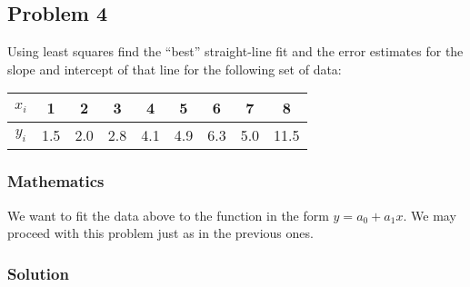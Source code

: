\subsection{Problem 4}%
\label{sec:problem_4}
Using least squares find the ``best'' straight-line fit and the error estimates for the
slope and intercept of that line for the following set of data:
\begin{center}
  \begin{tabular}{|c|c|c|c|c|c|c|c|c|}
    \hline
    $x_i$ & 1 & 2 & 3 & 4 & 5 & 6 & 7 & 8 \\
    \hline
    $y_i$ & 1.5 & 2.0 & 2.8 & 4.1 & 4.9 & 6.3 & 5.0 & 11.5 \\
    \hline
  \end{tabular}
\end{center}
\subsubsection*{Mathematics}
We want to fit the data above to the function in the form $y = a_0 + a_1x$.
We may proceed with this problem just as in the previous ones.
\subsubsection*{Solution}
